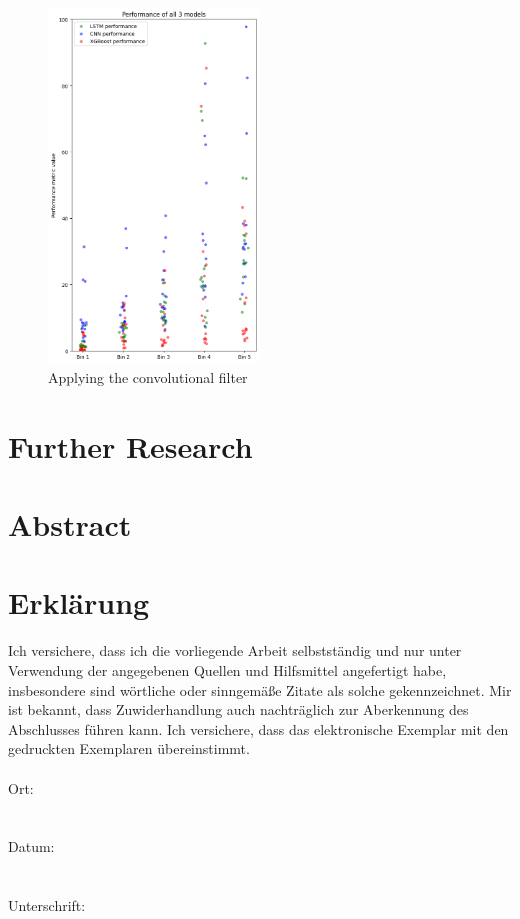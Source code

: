 \documentclass[a4paper,12pt]{report}
\begin{document}
\begin{figure}[htbp]
  \centering
  \includegraphics[width=0.5\textwidth]{images/results_combined.png}
  \caption{Applying the convolutional filter}
  \label{fig:fullwidth}
\end{figure}




\chapter{Further Research}



\printbibliography


\chapter{Abstract}






\chapter*{Erklärung}

Ich versichere, dass ich die vorliegende Arbeit selbstständig und nur unter Verwendung der
angegebenen Quellen und Hilfsmittel angefertigt habe, insbesondere sind wörtliche oder
sinngemäße Zitate als solche gekennzeichnet. Mir ist bekannt, dass Zuwiderhandlung auch
nachträglich zur Aberkennung des Abschlusses führen kann.
Ich versichere, dass das elektronische Exemplar mit den gedruckten Exemplaren übereinstimmt.\\\\

Ort:\\\\\\

Datum:\\\\\\

Unterschrift:
\end{document}
